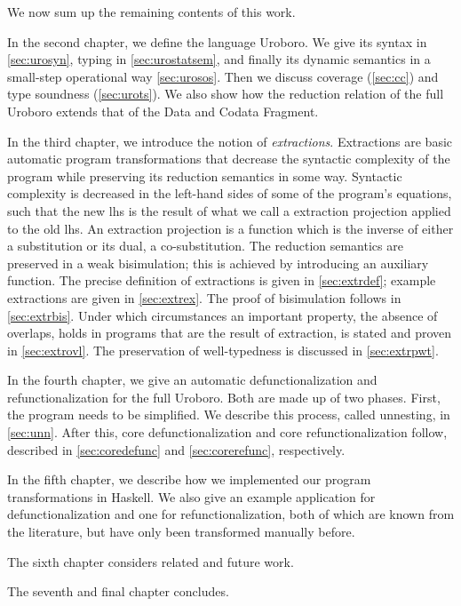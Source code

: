We now sum up the remaining contents of this work.

In the second chapter, we define the language Uroboro. We give its syntax in \autoref{sec:urosyn}, typing in \autoref{sec:urostatsem}, and finally its dynamic semantics in a small-step operational way \autoref{sec:urosos}. Then we discuss coverage (\autoref{sec:cc}) and type soundness (\autoref{sec:urots}). We also show how the reduction relation of the full Uroboro extends that of the Data and Codata Fragment.

In the third chapter, we introduce the notion of \textit{extractions}. Extractions are basic automatic program transformations that decrease the syntactic complexity of the program while preserving its reduction semantics in some way. Syntactic complexity is decreased in the left-hand sides of some of the program's equations, such that the new lhs is the result of what we call a extraction projection applied to the old lhs. An extraction projection is a function which is the inverse of either a substitution or its dual, a co-substitution. The reduction semantics are preserved in a weak bisimulation; this is achieved by introducing an auxiliary function. The precise definition of extractions is given in \autoref{sec:extrdef}; example extractions are given in \autoref{sec:extrex}. The proof of bisimulation follows in \autoref{sec:extrbis}. Under which circumstances an important property, the absence of overlaps, holds in programs that are the result of extraction, is stated and proven in \autoref{sec:extrovl}. The preservation of well-typedness is discussed in \autoref{sec:extrpwt}.

In the fourth chapter, we give an automatic defunctionalization and refunctionalization for the full Uroboro. Both are made up of two phases. First, the program needs to be simplified. We describe this process, called unnesting, in \autoref{sec:unn}. After this, core defunctionalization and core refunctionalization follow, described in \autoref{sec:coredefunc} and \autoref{sec:corerefunc}, respectively.

In the fifth chapter, we describe how we implemented our program transformations in Haskell. We also give an example application for defunctionalization and one for refunctionalization, both of which are known from the literature, but have only been transformed manually before.

The sixth chapter considers related and future work.

The seventh and final chapter concludes.

